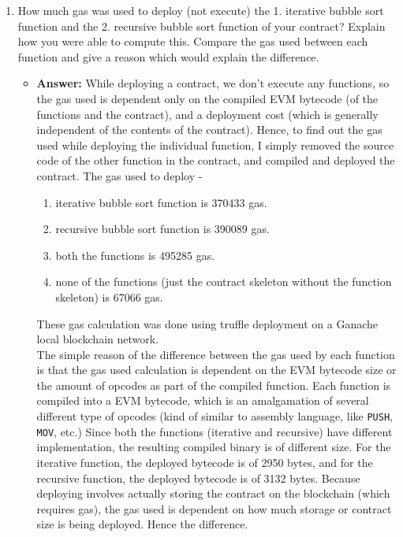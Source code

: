 \documentclass[11pt]{article}
\begin{document}
\begin{enumerate}
	\item How much gas was used to deploy (not execute) the 1. iterative bubble sort function and the 2. recursive bubble sort function of your contract? Explain how you were able to compute this. Compare the gas used between each function and give a reason which would explain the difference. 
	\begin{itemize}
	    \item \textbf{Answer: } While deploying a contract, we don't execute any functions, so the gas used is dependent only on the compiled EVM bytecode (of the functions and the contract), and a deployment cost (which is generally independent of the contents of the contract). Hence, to find out the gas used while deploying the individual function, I simply removed the source code of the other function in the contract, and compiled and deployed the contract. The gas used to deploy -
	    \begin{enumerate}
	        \item iterative bubble sort function is 370433 gas.
	        \item recursive bubble sort function is 390089 gas.
	        \item both the functions is 495285 gas.
	        \item none of the functions (just the contract skeleton without the function skeleton) is 67066 gas.
	    \end{enumerate}
	    These gas calculation was done using truffle deployment on a Ganache local blockchain network.\\
	    The simple reason of the difference between the gas used by each function is that the gas used calculation is dependent on the EVM bytecode size or the amount of opcodes as part of the compiled function. Each function is compiled into a EVM bytecode, which is an amalgamation of several different type of opcodes (kind of similar to assembly language, like \texttt{PUSH}, \texttt{MOV}, etc.) Since both the functions (iterative and recursive) have different implementation, the resulting compiled binary is of different size. For the iterative function, the deployed bytecode is of 2950 bytes, and for the recursive function, the deployed bytecode is of 3132 bytes. Because deploying involves actually storing the contract on the blockchain (which requires gas), the gas used is dependent on how much storage or contract size is being deployed. Hence the difference.
	\end{itemize}
	

\end{enumerate}
\end{document}
